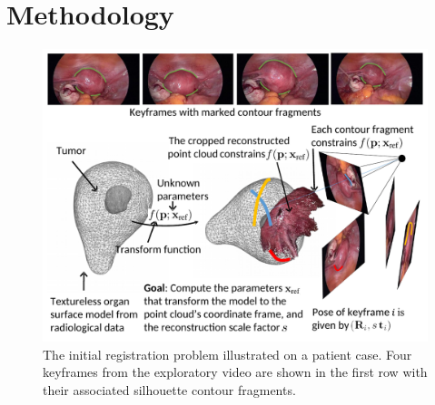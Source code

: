 





\section{Methodology}
\label{sec:ARGuidanceSystem}
\begin{figure}[t]
	\centering
	\includegraphics[width=0.8\columnwidth]{./figs/reconstructionDemoNew.pdf}
	\caption{The initial registration problem illustrated on a patient case. Four keyframes from the exploratory video are shown in the first row with their associated silhouette contour fragments.}
	\label{fig:initialRegOverview}
\end{figure}

